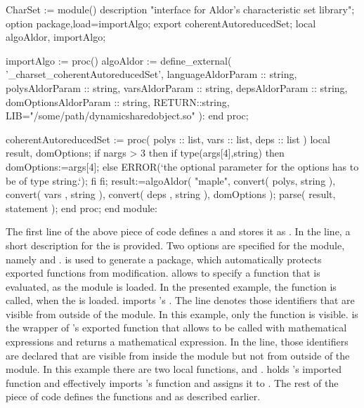 \begin{mapleprogram}
CharSet := module() 
    description "interface for Aldor's characteristic set library";     
    option package,load=importAlgo;
    export coherentAutoreducedSet;
    local algoAldor, importAlgo;

    importAlgo := proc()
      algoAldor := define_external(
       '_charset_coherentAutoreducedSet', 
        languageAldorParam   :: string, 
        polysAldorParam      :: string,
        varsAldorParam       :: string,
        depsAldorParam       :: string,
        domOptionsAldorParam :: string,
        RETURN::string,
        LIB="/some/path/dynamicsharedobject.so"
       ):
    end proc;

    coherentAutoreducedSet := proc( 
       polys   :: list,
       vars    :: list,
       deps    :: list
     )
      local result, domOptions;       
      if nargs > 3 then
        if type(args[4],string) then
          domOptions:=args[4];
        else
          ERROR(`the optional parameter for the options has to be of type string.`);
        fi
      fi;      
      result:=algoAldor(
        "maple",
        convert( polys, string ),
        convert( vars , string ),
        convert( deps , string ),
        domOptions
      );
      parse( result, statement );
    end proc;
end module:
\end{mapleprogram}

The first line of the above piece of code defines a  and stores it as . In the  line, a short description for the  is provided. Two options are specified for the module, namely  and .  is used to generate a \Maple package, which automatically protects exported functions from modification.  allows to specify a function that is evaluated, as the module is loaded. In the presented example, the function  is called, when the   is loaded.  imports \Aldor's \exportedsymbol. The  line denotes those identifiers that are visible from outside of the module. In this example, only the function  is visible.  is the wrapper of \Aldor's exported function that allows to be called with mathematical expressions and returns a mathematical expression. In the  line, those identifiers are declared that are visible from inside the module but not from outside of the module. In this example there are two local functions,  and .  holds \Aldor's imported function and  effectively imports \Aldor's function and assigns it to . The rest of the piece of code defines the functions  and  as described earlier.

